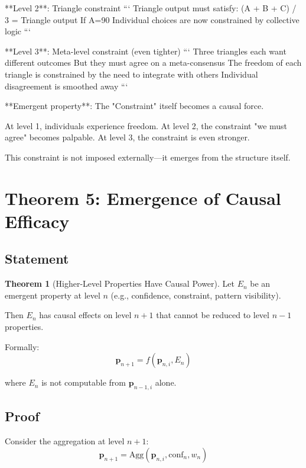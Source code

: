 \documentclass[12pt,a4paper]{article}
\theoremstyle{definition}
\newtheorem{theorem}{Theorem}[section]
\begin{document}
{**Level 2**: Triangle constraint
```
Triangle output must satisfy: (A + B + C) / 3 = Triangle output
If A=90%
Individual choices are now constrained by collective logic
```

**Level 3**: Meta-level constraint (even tighter)
```
Three triangles each want different outcomes
But they must agree on a meta-consensus
The freedom of each triangle is constrained by the need to integrate with others
Individual disagreement is smoothed away
```

**Emergent property**: The "Constraint" itself becomes a causal force. 

At level 1, individuals experience freedom. At level 2, the constraint "we must agree" becomes palpable. At level 3, the constraint is even stronger.

This constraint is not imposed externally—it emerges from the structure itself.

\section{Theorem 5: Emergence of Causal Efficacy}

\subsection{Statement}

\begin{theorem}[Higher-Level Properties Have Causal Power]
Let $E_n$ be an emergent property at level $n$ (e.g., confidence, constraint, pattern visibility).

Then $E_n$ has causal effects on level $n+1$ that cannot be reduced to level $n-1$ properties.

Formally:
$$\mathbf{p}_{n+1} = f(\mathbf{p}_{n,i}, E_n)$$

where $E_n$ is not computable from $\mathbf{p}_{n-1,i}$ alone.
\end{theorem}

\subsection{Proof}

Consider the aggregation at level $n+1$:
$$\mathbf{p}_{n+1} = \text{Agg}(\mathbf{p}_{n,i}, \text{conf}_n, w_n)$$

}
\end{document}
